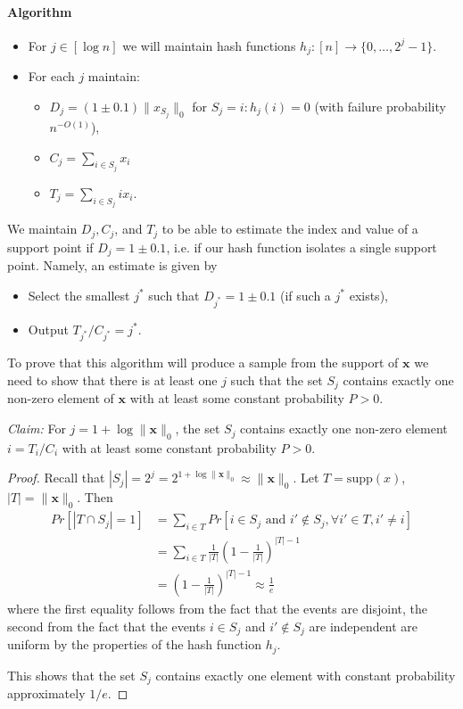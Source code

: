 \documentclass[11pt]{article}
\begin{document}
\paragraph{Algorithm}
\begin{itemize}
\item For $j \in [\log n]$ we will maintain hash functions $h_j : [n] \to \{0, \ldots, 2^j - 1\}$.
\item For each $j$ maintain:
  \begin{itemize}
  \item $D_j = (1\pm 0.1) \|x_{S_j}\|_0$ for $S_j = {i : h_j(i) = 0}$ (with failure probability $n^{-O(1)}$),
  \item $C_j = \sum_{i \in S_j} x_i$
  \item $T_j = \sum_{i \in S_j} i x_i$.
  \end{itemize}
\end{itemize}

We maintain $D_j, C_j$, and $T_j$ to be able to estimate the index and value of a support point if $D_j = 1 \pm 0.1$, i.e. if our hash function isolates a single support point. Namely, an estimate is given by
\begin{itemize}
\item Select the smallest $j^*$ such that $D_{j^*} = 1 \pm 0.1$ (if such a $j^*$ exists),
\item Output $T_{j^*} / C_{j^*} = j^*$.
\end{itemize}

To prove that this algorithm will produce a sample from the support of $\mathbf{x}$ we need to show that there is at least one $j$ such that the set $S_j$ contains exactly one non-zero element of $\mathbf{x}$ with at least some constant probability $P > 0$.

\emph{Claim:} For $j = 1 + \log \|\mathbf{x}\|_0$, the set $S_j$ contains exactly one non-zero element $i = T_i / C_i$ with at least some constant probability $P > 0$.
\begin{proof}
  Recall that $|S_j| = 2^j = 2^{1 + \log \|\mathbf{x}\|_0} \approx \|\mathbf{x}\|_0$. Let $T = \text{supp}(x)$, $|T| = \|\mathbf{x}\|_0$. Then
  \begin{align*}
    Pr[|T\cap S_j| = 1] &= \sum_{i \in T} Pr[i \in S_j \text{ and } i' \notin S_j, \forall i' \in T, i' \neq i]\\
                        &= \sum_{i \in T} \frac{1}{|T|}\left(1 - \frac{1}{|T|} \right)^{|T| - 1}\\
                        &= \left(1-\frac{1}{|T|} \right)^{|T| - 1} \approx \frac{1}{e}
  \end{align*}
  where the first equality follows from the fact that the events are disjoint, the second from the fact that the events $i \in S_j$ and $i' \notin S_j$ are independent are uniform by the properties of the hash function $h_j$.

  This shows that the set $S_j$ contains exactly one element with constant probability approximately $1/e$.
\end{proof}
\end{document}
